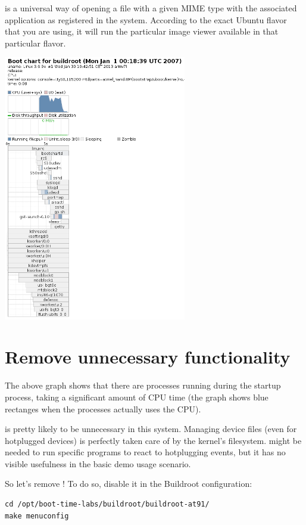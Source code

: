  is a universal way of opening a file with a given MIME
type with the associated application as registered in the system.
According to the exact Ubuntu flavor that you are using,
it will run the particular image viewer available in that
particular flavor.

\begin{center}
\includegraphics[width=8cm]{labs/boot-time-init-scripts/bootlog.png}
\end{center}

\section{Remove unnecessary functionality}

The above graph shows that there are  processes running
during the startup process, taking a significant amount of CPU time
(the graph shows blue rectanges when the processes actually uses
the CPU).

 is pretty likely to be unnecessary in this system. Managing
device files (even for hotplugged devices) is perfectly taken care
of by the kernel's  filesystem.  might be
needed to run specific programs to react to hotplugging events, but
it has no visible usefulness in the basic demo usage scenario.

So let's remove ! To do so, disable it in the Buildroot
configuration:

\begin{verbatim}
cd /opt/boot-time-labs/buildroot/buildroot-at91/
make menuconfig
\end{verbatim}

